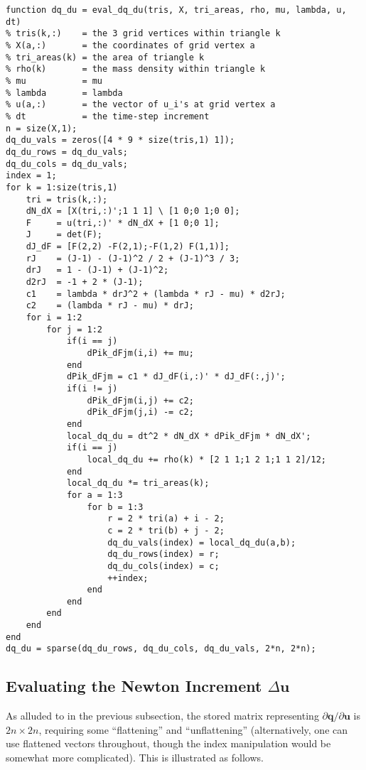 \documentclass{article}
\begin{document}
\begin{verbatim}
function dq_du = eval_dq_du(tris, X, tri_areas, rho, mu, lambda, u, dt)
% tris(k,:)    = the 3 grid vertices within triangle k
% X(a,:)       = the coordinates of grid vertex a
% tri_areas(k) = the area of triangle k
% rho(k)       = the mass density within triangle k
% mu           = mu
% lambda       = lambda
% u(a,:)       = the vector of u_i's at grid vertex a
% dt           = the time-step increment
n = size(X,1);
dq_du_vals = zeros([4 * 9 * size(tris,1) 1]);
dq_du_rows = dq_du_vals;
dq_du_cols = dq_du_vals;
index = 1;
for k = 1:size(tris,1)
    tri = tris(k,:);
    dN_dX = [X(tri,:)';1 1 1] \ [1 0;0 1;0 0];
    F     = u(tri,:)' * dN_dX + [1 0;0 1];
    J     = det(F);
    dJ_dF = [F(2,2) -F(2,1);-F(1,2) F(1,1)];
    rJ    = (J-1) - (J-1)^2 / 2 + (J-1)^3 / 3;
    drJ   = 1 - (J-1) + (J-1)^2;
    d2rJ  = -1 + 2 * (J-1);
    c1    = lambda * drJ^2 + (lambda * rJ - mu) * d2rJ;
    c2    = (lambda * rJ - mu) * drJ;
    for i = 1:2
        for j = 1:2
            if(i == j)
                dPik_dFjm(i,i) += mu;
            end
            dPik_dFjm = c1 * dJ_dF(i,:)' * dJ_dF(:,j)';
            if(i != j)
                dPik_dFjm(i,j) += c2;
                dPik_dFjm(j,i) -= c2;
            end
            local_dq_du = dt^2 * dN_dX * dPik_dFjm * dN_dX';
            if(i == j)
                local_dq_du += rho(k) * [2 1 1;1 2 1;1 1 2]/12;
            end
            local_dq_du *= tri_areas(k);
            for a = 1:3
                for b = 1:3
                    r = 2 * tri(a) + i - 2;
                    c = 2 * tri(b) + j - 2;
                    dq_du_vals(index) = local_dq_du(a,b);
                    dq_du_rows(index) = r;
                    dq_du_cols(index) = c;
                    ++index;
                end
            end
        end
    end
end
dq_du = sparse(dq_du_rows, dq_du_cols, dq_du_vals, 2*n, 2*n);
\end{verbatim}

\subsection{Evaluating the Newton Increment \(\Delta \mathbf{u}\)}

As alluded to in the previous subsection, the stored matrix representing \(\partial \mathbf{q} / \partial \mathbf{u}\) is \(2n \times 2n\), requiring some ``flattening'' and ``unflattening'' (alternatively, one can use flattened vectors throughout, though the index manipulation would be somewhat more complicated).  This is illustrated as follows.
\end{document}
